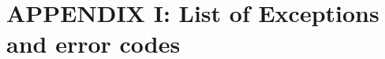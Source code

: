 \documentclass[10pt,utf8, mainlanguage=english]{ufcd-info}
\newcommand{\fret}[1]{{\texttt{#1}}}
\newcommand{\fmfattr}[1]{{\textbf{#1}}}
\newcommand{\fmfobj}[1]{{\textbf{\textsf{#1}}}}
\begin{document}





\section{APPENDIX I: List of Exceptions and error codes}
\end{document}
